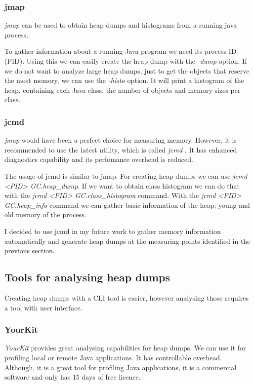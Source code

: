 \subsubsection{jmap}
\textit{jmap} \cite{jmap-jcmd} can be used to obtain heap dumps and histograms from a running java process.

To gather information about a running Java program we need its process ID (PID). Using this we can easily create the heap dump with the \textit{-dump} option. If we do not want to analyze large heap dumps, just to get the objects that reserve the most memory, we can use the \textit{-histo} option. It will print a histogram of the heap, containing each Java class, the number of objects and memory sizes per class.

\subsubsection{jcmd}
\textit{jmap} would have been a perfect choice for measuring memory. However, it is recommended to use the latest utility, which is called \textit{jcmd} \cite{jmap-jcmd}. It has enhanced diagnostics capability and its perfomance overhead is reduced. 

The usage of jcmd is similar to jmap. For creating heap dumps we can use \textit{jcmd <PID> GC.heap\_dump}. If we want to obtain class histogram we can do that with the \textit{jcmd <PID> GC.class\_histogram} command. With the \textit{jcmd <PID> GC.heap\_info} command we can gather basic information of the heap: \eg young and old memory of the process.

I decided to use jcmd in my future work to gather memory information automatically and generate heap dumps at the measuring points identified in the previous section.

\subsection{Tools for analysing heap dumps}
Creating heap dumps with a CLI tool is easier, however analysing those requires a tool with user interface. 

\subsubsection{YourKit}
\textit{YourKit} provides great analysing capabilities for heap dumps. We can use it for profiling local or remote Java applications. It has controllable overhead. Although, it is a great tool for profiling Java applications, it is a commercial software and only has 15 days of free licence.

